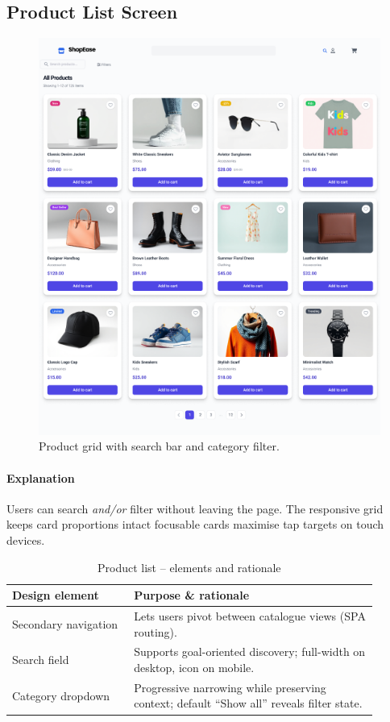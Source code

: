 \documentclass[11pt,a4paper]{article}
\begin{document}
\subsection{Product List Screen}

\begin{figure}[H]
	\centering
	\includegraphics[width=\linewidth]{pictures/main/Product_List_Figma}%
	\caption{Product grid with search bar and category filter.}
	\label{fig:ui-products}
\end{figure}

\paragraph{Explanation}%
Users can search \emph{and/or} filter without leaving the page.  
The responsive grid keeps card proportions intact  focusable
cards maximise tap targets on touch devices.

\begin{table}[H]
	\centering
	\caption{Product list – elements and rationale}
	\label{tab:product-elements}
	\begin{tabular}{p{0.30\linewidth} p{0.60\linewidth}}
		\toprule
		\textbf{Design element} & \textbf{Purpose \& rationale} \\ \midrule
		Secondary navigation    & Lets users pivot between catalogue views (SPA routing).\\
		Search field            & Supports goal-oriented discovery; full-width on desktop, icon on mobile.\\
		Category dropdown       & Progressive narrowing while preserving context; default “Show all” reveals filter state.\\
	
	
		\bottomrule
	\end{tabular}
\end{table}
\end{document}
